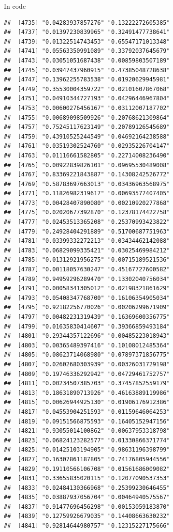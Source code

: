 \documentclass[ignorenonframetext,]{beamer}
\begin{document}
\begin{frame}[fragile]{In code}
\begin{verbatim}
##  [4735] "0.04283937857276" "0.13222272605385"
##  [4737] "0.01397230839965" "0.32491477738641"
##  [4739] "0.01322514743453" "0.65547171013348"
##  [4741] "0.05563350991089" "0.33792037645679"
##  [4743] "0.03051051687438" "0.00859803507189"
##  [4745] "0.03947437960915" "0.47385048728638"
##  [4747] "0.13962255783538" "0.01920629945981"
##  [4749] "0.35530004359722" "0.02101607867068"
##  [4751] "0.04910344727193" "0.04296446967804"
##  [4753] "0.00600276456167" "0.03112007187702"
##  [4755] "0.00689098509926" "0.20768621309864"
##  [4757] "0.75245117623149" "0.20789126545689"
##  [4759] "0.43910525244549" "0.04692164238588"
##  [4761] "0.03519302524760" "0.02935226704147"
##  [4763] "0.01116661582805" "0.22714008236490"
##  [4765] "0.00922839826101" "0.09695530489008"
##  [4767] "0.83369221843887" "0.14308242526772"
##  [4769] "0.58783697663013" "0.03436963568975"
##  [4771] "0.11826982319617" "0.00693577407405"
##  [4773] "0.00428407890080" "0.00210920277868"
##  [4775] "0.02020677392870" "0.12378174422758"
##  [4777] "0.02453513365208" "0.25370993423822"
##  [4779] "0.24928404291889" "0.51700687751963"
##  [4781] "0.03399332272213" "0.03434462142088"
##  [4783] "0.06829099335421" "0.03025469984212"
##  [4785] "0.01312921956275" "0.00715189521536"
##  [4787] "0.00118057630247" "0.45167727600582"
##  [4789] "0.94959296289470" "0.13302040756034"
##  [4791] "0.00058341305012" "0.02198321861629"
##  [4793] "0.05408347768700" "0.16106354905034"
##  [4795] "0.92182256770026" "0.00206299671909"
##  [4797] "0.00482231319439" "0.16369600356775"
##  [4799] "0.01635830414607" "0.39366859493184"
##  [4801] "0.29344357122696" "0.00485223018943"
##  [4803] "0.00365489397416" "0.10108012485364"
##  [4805] "0.08623714068980" "0.07897371856775"
##  [4807] "0.02602680303939" "0.00326031729198"
##  [4809] "0.19746336292942" "0.04729461752757"
##  [4811] "0.00234507385703" "0.37457852559179"
##  [4813] "0.18631890713926" "0.46163889119986"
##  [4815] "0.00626944925130" "0.01906176912386"
##  [4817] "0.04553904251593" "0.01159646064253"
##  [4819] "0.09151566875593" "0.16405152947156"
##  [4821] "0.93055014100862" "0.00637953318798"
##  [4823] "0.06824123282577" "0.01330866371774"
##  [4825] "0.01425103194905" "0.98631196398799"
##  [4827] "0.16307861187805" "0.74176805944556"
##  [4829] "0.19110566106708" "0.01561686009082"
##  [4831] "0.33655835020115" "0.12077090537353"
##  [4833] "0.02484130366968" "0.25399230646455"
##  [4835] "0.03887937056704" "0.00464940575567"
##  [4837] "0.91477696456298" "0.00153059183870"
##  [4839] "0.12759926679035" "0.14408663630232"
##  [4841] "0.92814644980757" "0.12315227175666"

\end{verbatim}
\end{frame}
\end{document}
